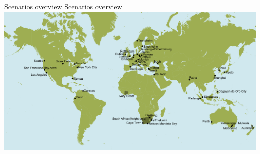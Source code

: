 \createfigure%
{Scenarios overview}%
{Scenarios overview}%
{\label{fig:scenarios}}%
{\includegraphics[width=0.99\textwidth, angle=0]{using/figures/MATSimModelsMap}}%
{}



%
%
%
%
%

